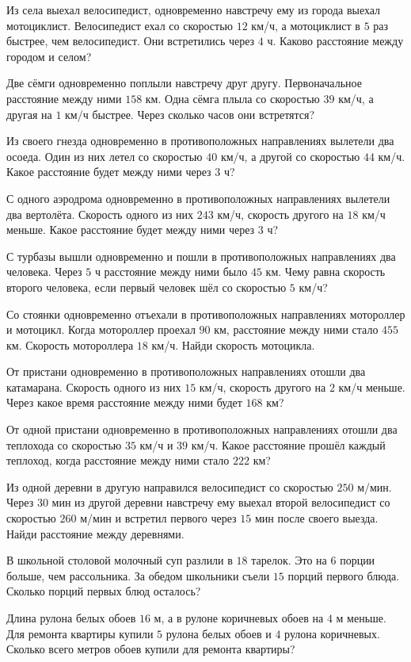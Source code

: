 \begin{class}[number=4]
	\begin{listofex}
		\item  Из села выехал велосипедист, одновременно навстречу ему из города выехал мотоциклист. Велосипедист ехал со скоростью \( 12 \) км/ч, а мотоциклист в \( 5 \) раз быстрее, чем велосипедист. Они встретились через \( 4 \) ч. Каково расстояние между городом и селом?
		\item Две сёмги одновременно поплыли навстречу друг другу. Первоначальное расстояние между ними \( 158 \) км. Одна сёмга плыла со скоростью \( 39 \) км/ч, а другая на \( 1 \) км/ч быстрее. Через сколько часов они встретятся?
		\item Из своего гнезда одновременно в противоположных направлениях вылетели два осоеда. Один из них летел со скоростью \( 40 \) км/ч, а другой со скоростью \( 44 \) км/ч. Какое расстояние будет между ними через \( 3 \) ч?
		\item С одного аэродрома одновременно в противоположных направлениях вылетели два вертолёта. Скорость одного из них \( 243  \) км/ч, скорость другого на \( 18 \) км/ч меньше. Какое расстояние будет между ними через \( 3 \) ч?
		\item С турбазы вышли одновременно и пошли в противоположных направлениях два человека. Через \( 5 \) ч расстояние между ними было \( 45 \) км. Чему равна скорость второго человека, если первый человек шёл со скоростью \( 5 \) км/ч?
		\item Со стоянки одновременно отъехали в противоположных направлениях мотороллер и мотоцикл. Когда мотороллер проехал \( 90  \) км, расстояние между ними стало \( 455 \) км. Скорость мотороллера \( 18 \) км/ч. Найди скорость мотоцикла.
		\item  От пристани одновременно в противоположных направлениях отошли два катамарана. Скорость одного из них \( 15 \) км/ч, скорость другого на \( 2 \) км/ч меньше. Через какое время расстояние между ними будет \( 168 \) км?
		\item От одной пристани одновременно в противоположных направлениях отошли два теплохода со скоростью \( 35 \) км/ч и \( 39 \) км/ч. Какое расстояние прошёл каждый теплоход, когда расстояние между ними стало \( 222 \) км?
		\item Из одной деревни в другую направился велосипедист со скоростью \(  250  \) м/мин. Через \( 30 \) мин из другой деревни навстречу ему выехал второй велосипедист со скоростью \( 260 \) м/мин и встретил первого через \( 15 \) мин после своего выезда. Найди расстояние между деревнями.
		\item В школьной столовой молочный суп разлили в \( 18 \) тарелок. Это на \( 6 \) порции больше, чем рассольника. За обедом школьники съели \( 15 \) порций первого блюда. Сколько порций первых блюд осталось?
		\item Длина рулона белых обоев \( 16 \) м, а в рулоне коричневых обоев на \( 4 \) м меньше. Для ремонта квартиры купили \( 5 \) рулона белых обоев и \( 4 \) рулона коричневых. Сколько всего  метров обоев  купили для ремонта квартиры?
	\end{listofex}
\end{class}

